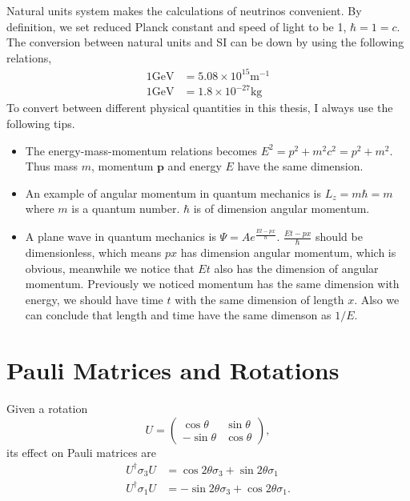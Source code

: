 Natural units system makes the calculations of neutrinos convenient. By definition, we set reduced Planck constant and speed of light to be 1, $\hbar = 1 = c$.
The conversion between natural units and SI can be down by using the following relations,
\begin{align}
   1 \mathrm{GeV} &= 5.08 \times 10^{15} \mathrm {m^{-1}} \\
   1 \mathrm{GeV} &= 1.8\times 10^{-27} \mathrm{kg}
\end{align}
To convert between different physical quantities in this thesis, I always use the following tips.
\begin{itemize}
    \item The energy-mass-momentum relations becomes $E^2 = p^2 + m^2c^2 = p^2 + m^2$. Thus mass $m$, momentum $\mathbf p$ and energy $E$ have the same dimension.
    \item An example of angular momentum in quantum mechanics is $L_z = m\hbar = m$ where $m$ is a quantum number. $\hbar$ is of dimension angular momentum.
    \item A plane wave in quantum mechanics is $\Psi = A e^{ \frac{E t - p x}{\hbar} }$. $\frac{E t - p x}{\hbar}$ should be dimensionless, which means $px$ has dimension angular momentum, which is obvious, meanwhile we notice that $E t$ also has the dimension of angular momentum. Previously we noticed momentum has the same dimension with energy, we should have time $t$ with the same dimension of length $x$. Also we can conclude that length and time have the same dimenson as $1/E$.
\end{itemize}



\section{Pauli Matrices and Rotations}


Given a rotation
\begin{equation}
   U = \begin{pmatrix} \cos \theta & \sin \theta \\ -\sin\theta & \cos \theta \end{pmatrix}, 
\end{equation}
its effect on Pauli matrices are
\begin{align}
      U^\dagger \sigma_3 U  &=\cos 2\theta \sigma_3 + \sin 2\theta \sigma_1 \\
  U^\dagger \sigma_1 U & = -\sin 2\theta \sigma_3 + \cos 2\theta \sigma_1.
\end{align}


